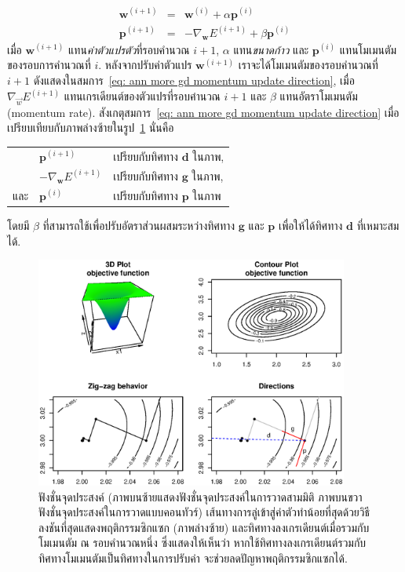 \begin{eqnarray}
   \mathbf{w}^{(i+1)} &=& \mathbf{w}^{(i)} + \alpha \mathbf{p}^{(i)}
\label{eq: ann more gd momentum update weights} \\   
   \mathbf{p}^{(i+1)} &=& - \nabla_{\mathbf{w}} E^{(i+1)} + \beta \mathbf{p}^{(i)}      
\label{eq: ann more gd momentum update direction}    
\end{eqnarray}
เมื่อ $\mathbf{w}^{(i+1)}$ แทน\textit{ค่าตัวแปรตัว}ที่รอบคำนวณ $i+1$,
$\alpha$ แทน\textit{ขนาดก้าว} และ
$\mathbf{p}^{(i)}$ แทนโมเมนตัมของรอบการคำนวณที่ $i$.
หลังจากปรับค่าตัวแปร $\mathbf{w}^{(i+1)}$
เราจะได้โมเมนตัมของรอบคำนวณที่ $i+1$ ดังแสดงในสมการ~\ref{eq: ann more gd momentum update direction},
เมื่อ $\nabla_{\vec{w}} E^{(i+1)}$ แทนเกรเดียนต์ของตัวแปรที่รอบคำนวณ $i+1$ 
และ $\beta$ แทนอัตราโมเมนตัม (momentum rate).
สังเกตุสมการ~\ref{eq: ann more gd momentum update direction} เมื่อเปรียบเทียบกับภาพล่างซ้ายในรูป~\ref{fig: more ann zig zag and momentum}
นั่นคือ\\
\begin{tabular}{lll}
& $\mathbf{p}^{(i+1)}$ & เปรียบกับทิศทาง $\mathbf{d}$ ในภาพ, \\
& $- \nabla_{\mathbf{w}} E^{(i+1)}$ & เปรียบกับทิศทาง $\mathbf{g}$ ในภาพ, \\
และ & $\mathbf{p}^{(i)}$ & เปรียบกับทิศทาง $\mathbf{p}$ ในภาพ \\
\end{tabular} 

โดยมี $\beta$ ที่สามารถใช้เพื่อปรับอัตราส่วนผสมระหว่างทิศทาง $\mathbf{g}$ และ $\mathbf{p}$ เพื่อให้ได้ทิศทาง $\mathbf{d}$ ที่เหมาะสมได้.

%
\begin{figure}
\begin{center}
\includegraphics[height=3in]{04ANNmore/MomentumMotivation02.eps}
\end{center}
\caption{ฟังชั่นจุดประสงค์ (ภาพบนซ้ายแสดงฟังชั่นจุดประสงค์ในการวาดสามมิติ ภาพบนขวาฟังชั่นจุดประสงค์ในการวาดแบบคอนทัวร์) 
เส้นทางการลู่เข้าสู่ค่าตัวทำน้อยที่สุดด้วยวิธีลงชันที่สุดแสดงพฤติกรรมซิกแซก (ภาพล่างซ้าย)
และทิศทางลงเกรเดียนต์เมื่อรวมกับโมเมนตัม ณ รอบคำนวณหนึ่ง ซึ่งแสดงให้เห็นว่า
หากใช้ทิศทางลงเกรเดียนต์รวมกับทิศทางโมเมนตัมเป็นทิศทางในการปรับค่า จะช่วยลดปัญหาพฤติกรรมซิกแซกได้.}
\label{fig: more ann zig zag and momentum}
\end{figure}

